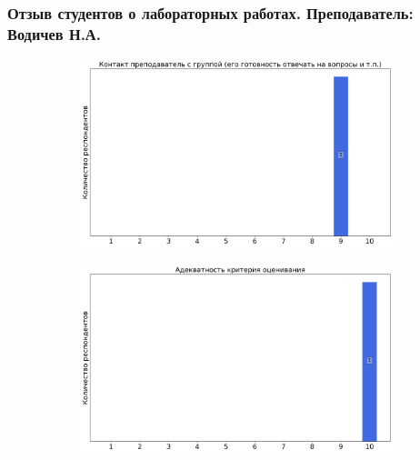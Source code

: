     \subsubsection{Отзыв студентов о лабораторных работах. Преподаватель: Водичев Н.А.}
        \begin{figure}[H]
            \centering
            \begin{subfigure}[b]{0.45\textwidth}
                \centering
                \includegraphics[width=\textwidth]{images/3 course/Радиофизическая лаборатория/labniks-marks-Водичев Н.А.-0.png}
            \end{subfigure}
            \begin{subfigure}[b]{0.45\textwidth}
                \centering
                \includegraphics[width=\textwidth]{images/3 course/Радиофизическая лаборатория/labniks-marks-Водичев Н.А.-1.png}
            \end{subfigure}
            \begin{subfigure}[b]{0.45\textwidth}
                \centering

\end{subfigure}
\end{figure}
